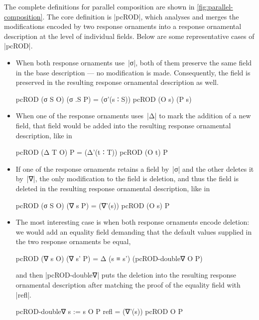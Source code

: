 The complete definitions for parallel composition are shown in \autoref{fig:parallel-composition}.
The core definition is |pcROD|, which analyses and merges the modifications encoded by two response ornaments into a response ornamental description at the level of individual fields.
Below are some representative cases of |pcROD|.
\begin{itemize}
\item When both response ornaments use~|σ|, both of them preserve the same field in the base description --- no modification is made.
Consequently, the field is preserved in the resulting response ornamental description as well.
\begin{code}
pcROD (σ S O) (σ .S P) = (σ'(s ∶ S)) pcROD (O s) (P s)
\end{code}
\item When one of the response ornaments uses~|Δ| to mark the addition of a new field, that field would be added into the resulting response ornamental description, like in
\begin{code}
pcROD (Δ T O) P = (Δ'(t ∶ T)) pcROD (O t) P
\end{code}
\item If one of the response ornaments retains a field by~|σ| and the other deletes it by~|∇|, the only modification to the field is deletion, and thus the field is deleted in the resulting response ornamental description, like in
\begin{code}
pcROD (σ S O) (∇ s P) = (∇'(s)) pcROD (O s) P
\end{code}
\item The most interesting case is when both response ornaments encode deletion: we would add an equality field demanding that the default values supplied in the two response ornaments be equal,
\begin{code}
pcROD (∇ s O) (∇ s' P) = Δ (s ≡ s') (pcROD-double∇ O P)
\end{code}
and then |pcROD-double∇| puts the deletion into the resulting response ornamental description after matching the proof of the equality field with |refl|.
\begin{code}
pcROD-double∇ {s := s} O P refl = (∇'(s)) pcROD O P
\end{code}

\end{itemize}
